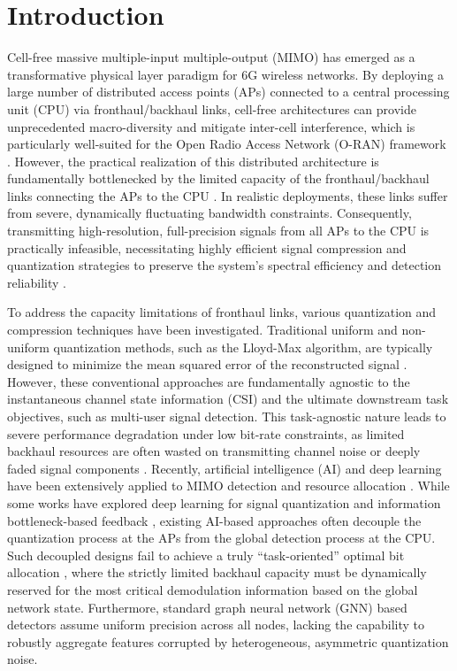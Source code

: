 \section{Introduction}

Cell-free massive multiple-input multiple-output (MIMO) has emerged as a transformative physical layer paradigm for 6G wireless networks. By deploying a large number of distributed access points (APs) connected to a central processing unit (CPU) via fronthaul/backhaul links, cell-free architectures can provide unprecedented macro-diversity and mitigate inter-cell interference, which is particularly well-suited for the Open Radio Access Network (O-RAN) framework \cite{pereira2025pixel, dai2025two}. However, the practical realization of this distributed architecture is fundamentally bottlenecked by the limited capacity of the fronthaul/backhaul links connecting the APs to the CPU \cite{xie2026meta, danaee2024relevance}. In realistic deployments, these links suffer from severe, dynamically fluctuating bandwidth constraints. Consequently, transmitting high-resolution, full-precision signals from all APs to the CPU is practically infeasible, necessitating highly efficient signal compression and quantization strategies to preserve the system's spectral efficiency and detection reliability \cite{danaee2025relevance}.

To address the capacity limitations of fronthaul links, various quantization and compression techniques have been investigated. Traditional uniform and non-uniform quantization methods, such as the Lloyd-Max algorithm, are typically designed to minimize the mean squared error of the reconstructed signal \cite{wang2020information}. However, these conventional approaches are fundamentally agnostic to the instantaneous channel state information (CSI) and the ultimate downstream task objectives, such as multi-user signal detection. This task-agnostic nature leads to severe performance degradation under low bit-rate constraints, as limited backhaul resources are often wasted on transmitting channel noise or deeply faded signal components \cite{shlezinger2021deep, zou2022goal}. Recently, artificial intelligence (AI) and deep learning have been extensively applied to MIMO detection \cite{he2020model, wei2020learned, sun2020learning} and resource allocation \cite{gao2020resource, syahran2026solving}. While some works have explored deep learning for signal quantization \cite{arvinte2020eq, feys2025learning} and information bottleneck-based feedback \cite{ma2022augmented, cao2022information}, existing AI-based approaches often decouple the quantization process at the APs from the global detection process at the CPU. Such decoupled designs fail to achieve a truly ``task-oriented'' optimal bit allocation \cite{mostaani2022task}, where the strictly limited backhaul capacity must be dynamically reserved for the most critical demodulation information based on the global network state. Furthermore, standard graph neural network (GNN) based detectors \cite{guo2026cell} assume uniform precision across all nodes, lacking the capability to robustly aggregate features corrupted by heterogeneous, asymmetric quantization noise.

